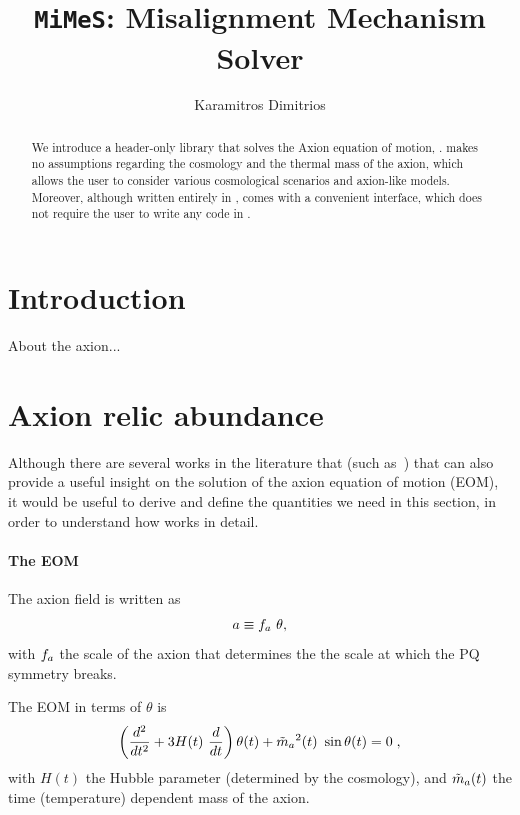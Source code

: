 \documentclass[11pt,a4paper]{article}
\author{Karamitros Dimitrios}
\title{{\tt MiMeS}: Misalignment Mechanism Solver}
\begin{document}
\maketitle

\begin{abstract}
	We introduce a \CPP header-only library that solves the Axion equation of motion, \mimes.  
	\mimes makes no assumptions regarding the cosmology and the thermal mass of the axion, which allows the user 
	to consider various cosmological scenarios and axion-like models.
	Moreover, although written entirely in \CPP, \mimes comes with a convenient \PY interface, which does not require the
	user to write any code in \CPP.
\end{abstract}


\section{Introduction}\label{sec:intro}
\setcounter{equation}{0}

About the axion...

\section{Axion relic abundance}\label{sec:abundance}
\setcounter{equation}{0}
%
Although there are several works in the literature that (such as~\cite{Chang:1998ys}) that can also provide a useful insight on the solution of the axion equation of motion (EOM), it would be useful to derive and define the quantities we need in this section, in order to understand how \mimes works in detail.

\paragraph{The EOM} The axion field is written as 
%
\begin{equation}
	a  \equiv f_{a}{} \ \theta,
	\label{eq:fa_def}
\end{equation}
%
with $f_{a}{}$ the scale of the axion that determines the the scale at which the PQ symmetry breaks. 

The EOM in terms of $\theta$ is 
%
\begin{equation}
	\lrb{\dfrac{d^2}{d t^2} + 3 H(t) \ \dfrac{d}{d t} } \theta(t) + \maT^2(t) \ \sin \theta(t) = 0 \; ,
	\label{eq:eom}
\end{equation}
%
with $H(t)$ the Hubble parameter (determined by the cosmology), and $\tilde m_{a}{}(t)$  the time (temperature) dependent mass of the axion. 
\end{document}
